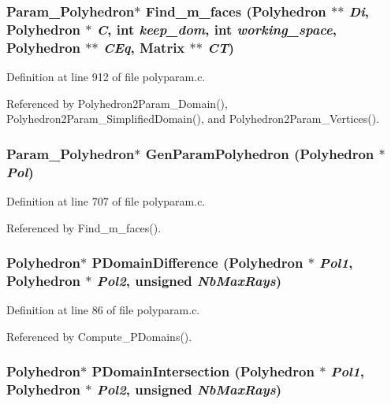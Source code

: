 \subsubsection{\setlength{\rightskip}{0pt plus 5cm}Param\_\-Polyhedron$\ast$ Find\_\-m\_\-faces (Polyhedron $\ast$$\ast$ {\em Di}, Polyhedron $\ast$ {\em C}, int {\em keep\_\-dom}, int {\em working\_\-space}, Polyhedron $\ast$$\ast$ {\em CEq}, Matrix $\ast$$\ast$ {\em CT})}\label{polyparam_8c_a33}




Definition at line 912 of file polyparam.c.

Referenced by Polyhedron2Param\_\-Domain(), Polyhedron2Param\_\-Simplified\-Domain(), and Polyhedron2Param\_\-Vertices().

\subsubsection{\setlength{\rightskip}{0pt plus 5cm}Param\_\-Polyhedron$\ast$ Gen\-Param\-Polyhedron (Polyhedron $\ast$ {\em Pol})}\label{polyparam_8c_a30}




Definition at line 707 of file polyparam.c.

Referenced by Find\_\-m\_\-faces().

\subsubsection{\setlength{\rightskip}{0pt plus 5cm}Polyhedron$\ast$ PDomain\-Difference (Polyhedron $\ast$ {\em Pol1}, Polyhedron $\ast$ {\em Pol2}, unsigned {\em Nb\-Max\-Rays})}\label{polyparam_8c_a21}




Definition at line 86 of file polyparam.c.

Referenced by Compute\_\-PDomains().

\subsubsection{\setlength{\rightskip}{0pt plus 5cm}Polyhedron$\ast$ PDomain\-Intersection (Polyhedron $\ast$ {\em Pol1}, Polyhedron $\ast$ {\em Pol2}, unsigned {\em Nb\-Max\-Rays})}\label{polyparam_8c_a20}




